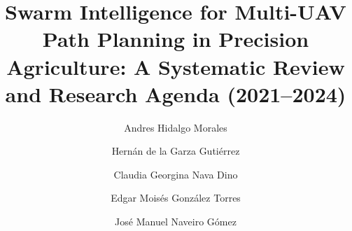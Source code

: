 \documentclass[review,3p,times]{elsarticle}
\begin{document}
\begin{frontmatter}
\title{Swarm Intelligence for Multi-UAV Path Planning in Precision Agriculture: A Systematic Review and Research Agenda (2021--2024)}

\author{\texorpdfstring{Andres Hidalgo Morales}{Andres Hidalgo Morales}}

\author{\texorpdfstring{Hernán de la Garza Gutiérrez}{Hernán de la Garza Gutiérrez}}

\author{\texorpdfstring{Claudia Georgina Nava Dino}{Claudia Georgina Nava Dino}}

\author{\texorpdfstring{Edgar Moisés González Torres}{Edgar Moisés González Torres}}

\author{\texorpdfstring{José Manuel Naveiro Gómez}{José Manuel Naveiro Gómez}}


\address[1]{Instituto Tecnológico de Chihuahua II, Tecnológico Nacional de México, Chihuahua, México}
\address[2]{Universidad Politécnica de Chihuahua, Chihuahua, México}
\address[3]{Facultad de Ingeniería, Universidad Autónoma de Chihuahua, Chihuahua, México}
\address[4]{Departamento de Ingeniería Mecánica, Universidad de Zaragoza, Zaragoza, España}


\end{frontmatter}
\end{document}
